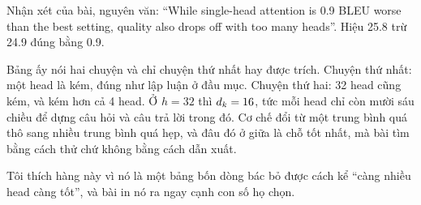 Nhận xét của bài, nguyên văn: \enquote{While single-head attention is 0.9 BLEU
worse than the best setting, quality also drops off with too many heads}. Hiệu
25.8 trừ 24.9 đúng bằng 0.9.

Bảng ấy nói hai chuyện và chỉ chuyện thứ nhất hay được trích. Chuyện thứ nhất:
một head là kém, đúng như lập luận ở đầu mục. Chuyện thứ hai: 32 head cũng kém,
và kém hơn cả 4 head. Ở \(h = 32\) thì \(d_{k} = 16\), tức mỗi head chỉ còn mười sáu
chiều để dựng câu hỏi và câu trả lời trong đó. Cơ chế đổi từ một trung bình quá
thô sang nhiều trung bình quá hẹp, và đâu đó ở giữa là chỗ tốt nhất, mà bài tìm
bằng cách thử chứ không bằng cách dẫn xuất.

Tôi thích hàng này vì nó là một bảng bốn dòng bác bỏ được cách kể \enquote{càng
nhiều head càng tốt}, và bài in nó ra ngay cạnh con số họ chọn.
